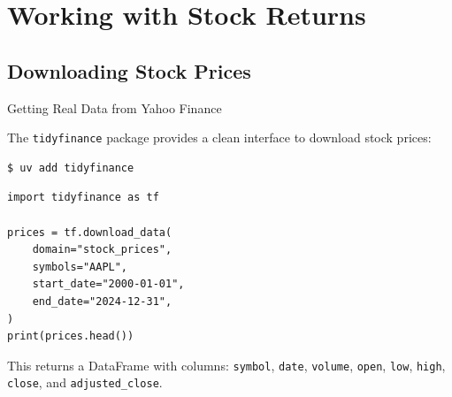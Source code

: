 \documentclass[9pt,aspectratio=169]{beamer}
\begin{document}
\section{Working with Stock Returns}
\subsection{Downloading Stock Prices}

\begin{frame}[fragile]{Getting Real Data from Yahoo Finance}

The \texttt{tidyfinance} package provides a clean interface to download stock prices:

\begin{lstlisting}[style=shell]
$ uv add tidyfinance
\end{lstlisting}

\begin{lstlisting}
import tidyfinance as tf

prices = tf.download_data(
    domain="stock_prices",
    symbols="AAPL",
    start_date="2000-01-01",
    end_date="2024-12-31",
)
print(prices.head())
\end{lstlisting}

\medskip

This returns a DataFrame with columns: \texttt{symbol}, \texttt{date}, \texttt{volume}, \texttt{open}, \texttt{low}, \texttt{high}, \texttt{close}, and \texttt{adjusted\_close}.

\end{frame}
\end{document}
